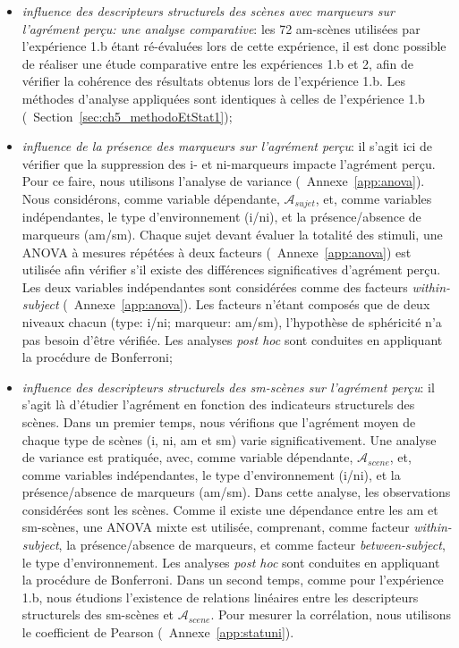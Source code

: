 \begin{itemize}
\item \emph{influence des descripteurs structurels des scènes avec marqueurs sur l'agrément perçu: une analyse comparative}: les 72 am-scènes utilisées par l'expérience 1.b étant ré-évaluées lors de cette expérience, il est donc possible de réaliser une étude comparative entre les expériences 1.b et 2, afin de vérifier la cohérence des résultats obtenus lors de l'expérience 1.b. Les méthodes d'analyse appliquées sont identiques à celles de l'expérience 1.b (\cf~Section~\ref{sec:ch5_methodoEtStat1});
\item \emph{influence de la présence des marqueurs sur l'agrément perçu}: il s'agit ici de vérifier que la suppression des i- et ni-marqueurs impacte l'agrément perçu. Pour ce faire, nous utilisons l'analyse de variance (\cf~Annexe~\ref{app:anova}). Nous considérons, comme variable dépendante,  $\mathcal{A}_{sujet}$, et, comme variables indépendantes, le type d'environnement (i/ni), et la présence/absence de marqueurs (am/sm). Chaque sujet devant évaluer la totalité des stimuli, une ANOVA à mesures répétées à deux facteurs (\cf~Annexe~\ref{app:anova}) est utilisée afin vérifier s'il existe des différences significatives d'agrément perçu. Les deux variables indépendantes sont considérées comme des facteurs \emph{within-subject} (\cf~Annexe~\ref{app:anova}). Les facteurs n'étant composés que de deux niveaux chacun (type: i/ni; marqueur: am/sm), l'hypothèse de sphéricité n'a pas besoin d'être vérifiée. Les analyses \emph{post hoc} sont conduites en appliquant la procédure de Bonferroni;
\item \emph{influence des descripteurs structurels des sm-scènes sur l'agrément perçu}: il s'agit là d'étudier l'agrément en fonction des indicateurs structurels des scènes. Dans un premier temps, nous vérifions que l'agrément moyen de chaque type de scènes (i, ni, am et sm) varie significativement. Une analyse de variance est pratiquée, avec, comme variable dépendante,  $\mathcal{A}_{scene}$, et, comme variables indépendantes, le type d'environnement (i/ni), et la présence/absence de marqueurs (am/sm). Dans cette analyse, les observations considérées sont les scènes. Comme il existe une dépendance entre les am et sm-scènes, une ANOVA mixte est utilisée, comprenant, comme facteur \emph{within-subject}, la présence/absence de marqueurs, et comme facteur \emph{between-subject}, le type d'environnement. Les analyses \emph{post hoc} sont conduites en appliquant la procédure de Bonferroni. Dans un second temps, comme pour l'expérience 1.b, nous étudions l'existence de relations linéaires entre les descripteurs structurels des sm-scènes et $\mathcal{A}_{scene}$. Pour mesurer la corrélation, nous utilisons le coefficient de Pearson (\cf~Annexe~\ref{app:statuni}).
\end{itemize}

